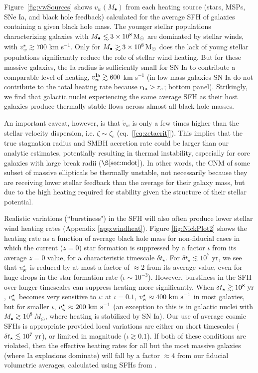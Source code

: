 \documentclass[usenatbib,fleqn]{mn2e}
\newcommand\lsim{\mathrel{\rlap{\lower4pt\hbox{\hskip1pt$\sim$}}
    \raise1pt\hbox{$<$}}}
\newcommand\gsim{\mathrel{\rlap{\lower4pt\hbox{\hskip1pt$\sim$}}
    \raise1pt\hbox{$>$}}}
\newcommand{\rs}{r_s}
\newcommand{\vw}{\tilde{v}_{w}}
\newcommand{\Mbh}[1][]{M_{\bullet#1}}
\newcommand{\vwO}{v_{w}}
\begin{document}
Figure~\ref{fig:vwSources} shows $\vwO(M_{\bullet})$ from each heating
source (stars, MSPs, SNe Ia, and black hole feedback) calculated for
the average SFH of galaxies containing a given black hole mass.  The
younger stellar populations characterizing galaxies with $\Mbh\lsim
3\times 10^{8} \Msun$ are dominated by stellar winds, with
$v_{w}^{\star} \gtrsim 700$ km s$^{-1}$.  Only for $\Mbh\gsim 3\times
10^{8} \Msun$ does the lack of young stellar populations significantly
reduce the role of stellar wind heating.  But for these massive
galaxies, the Ia radius is sufficiently small for SN Ia to contribute
a comparable level of heating, $v_{w}^{\rm Ia} \gtrsim 600$ km
s$^{-1}$ (in low mass galaxies SN Ia do not contribute to the total
heating rate because $r_{\rm Ia} > \rs$; bottom panel).  Strikingly,
we find that galactic nuclei experiencing the same average SFH as
their host galaxies produce thermally stable flows across almost all
black hole masses.

An important caveat, however, is that $\vw$ is only a few times higher
than the stellar velocity dispersion, i.e. $\zeta \sim \zeta_c$
(eq.~[\ref{eq:zetacrit}]).  This implies that the true stagnation
radius and SMBH accretion rate could be larger than our analytic
estimates, potentially resulting in thermal instability, especially
for core galaxies with large break radii ($\S\ref{sec:mdot}$).  In
other words, the CNM of some subset of massive ellipticals be
thermally unstable, not necessarily because they are receiving lower
stellar feedback than the average for their galaxy mass, but due to
the high heating required for stability given the structure of their
stellar potential.

Realistic variations (``burstiness") in the SFH
will also often produce lower stellar wind heating rates (Appendix
\ref{app:windheat}).  Figure \ref{fig:NickPlot2} shows the heating
rate as a function of average black hole mass for non-fiducial cases
in which the current ($z = 0$) star formation is suppressed by a
factor $\iota$ from its average $z = 0$ value, for a characteristic
timescale $\delta t_{\star}$.  For $\delta t_{\star} \lesssim 10^{7}$
yr, we see that $v_{\rm w}^{\star}$ is reduced by at most a factor of
$\approx 2$ from its average value, even for huge drops in the star
formation rate ($\iota \sim 10^{-3}$).  However, burstiness in the
SFH over longer timescales can suppress heating
more significantly.  When $\delta t_{\star} \gtrsim 10^8~{\rm yr}$,
$v_{\rm w}^\star$ becomes very sensitive to $\iota$: at $\iota=0.1$,
$v_{\rm w}^\star \approx 400~{\rm km~s}^{-1}$ in most galaxies, but
for smaller $\iota$, $v_{\rm w}^\star \approx 200~{\rm km~s}^{-1}$ (an
exception to this is in galactic nuclei with $M_\bullet \gtrsim
10^8~M_\odot$, where heating is stabilized by SN Ia).  Our use
of average cosmic SFHs is appropriate provided
local variations are either on short timescales ($\delta t_{\star}
\lesssim 10^7~{\rm yr}$), or limited in magnitude ($\iota \gtrsim
0.1$).  If both of these conditions are violated, then the effective
heating rates for all but the most massive galaxies (where Ia
explosions dominate) will fall by a factor $\approx 4$ from our
fiducial volumetric averages, calculated using SFHs from \citet{MosterNaab+:2013a}.
\end{document}
